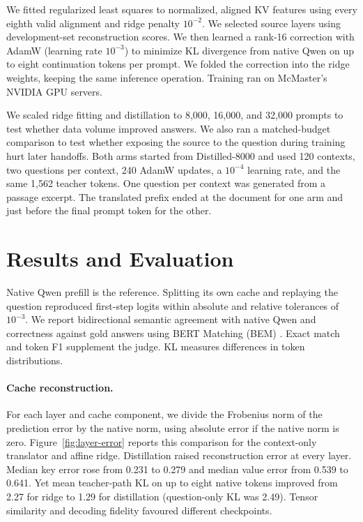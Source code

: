 \documentclass[11pt]{article}
\begin{document}
We fitted regularized least squares to normalized, aligned KV
features using every eighth valid alignment and ridge penalty
$10^{-2}$. We selected source layers using development-set
reconstruction scores. We then learned a rank-16 correction with AdamW (learning rate
$10^{-3}$) to minimize KL divergence from native Qwen on up to eight
continuation tokens per prompt. We folded the correction into the
ridge weights, keeping the same inference operation. Training ran on
McMaster's NVIDIA GPU servers.

We scaled ridge fitting and distillation to 8,000, 16,000, and 32,000
prompts to test whether data volume improved answers. We also ran a
matched-budget comparison to test whether exposing the source to the
question during training hurt later handoffs. Both arms started from
Distilled-8000 and used 120 contexts, two questions per context,
240 AdamW updates, a $10^{-4}$ learning rate, and the same 1,562 teacher
tokens. One question per context was generated from a passage excerpt.
The translated prefix ended at the document for one arm and just
before the final prompt token for the other.

\section{Results and Evaluation}

Native Qwen prefill is the reference. Splitting its own cache and
replaying the question reproduced first-step logits within absolute
and relative tolerances of $10^{-3}$. We report bidirectional semantic
agreement with native Qwen and correctness against gold answers using
BERT Matching (BEM) \citep{Bulian2022}. Exact match and token F1
supplement the judge. KL measures differences in token distributions.



\paragraph{Cache reconstruction.}
For each layer and cache component, we divide the Frobenius norm of
the prediction error by the native norm, using absolute error if
the native norm is zero. Figure~\ref{fig:layer-error} reports this
comparison for the context-only translator and affine ridge.
Distillation raised reconstruction error at every layer. Median
key error rose from 0.231 to 0.279 and median value error from
0.539 to 0.641. Yet mean teacher-path KL on up to eight native
tokens improved from 2.27 for ridge to 1.29 for distillation
(question-only KL was 2.49). Tensor similarity and decoding fidelity
favoured different checkpoints.
\end{document}
